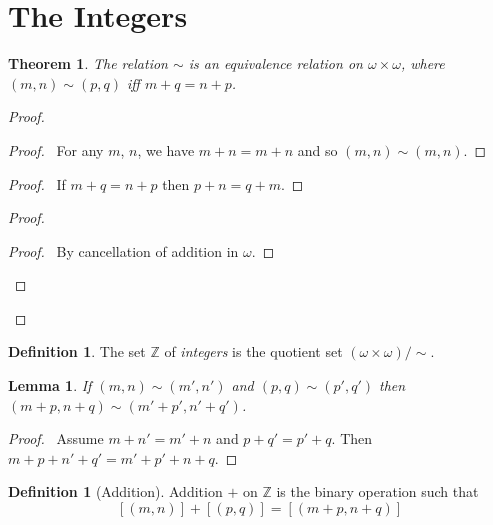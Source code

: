 \documentclass{article}
\let\qed\relax
\newtheorem{lemma}[axiom]{Lemma}
\newtheorem{theorem}[axiom]{Theorem}
\theoremstyle{definition}
\newtheorem{definition}[axiom]{Definition}
\begin{document}
    \section{The Integers}

    \begin{theorem}
        The relation $\sim$ is an equivalence relation on $\omega \times \omega$, where $(m,n) \sim (p,q)$ iff
        $m + q = n + p$.
    \end{theorem}

    \begin{proof}
        \pf
        \begin{proof}
            \pf\ For any $m$, $n$, we have $m + n = m + n$ and so $(m,n) \sim (m,n)$.
        \end{proof}
        \begin{proof}
            \pf\ If $m + q = n + p$ then $p + n = q + m$.
        \end{proof}
        \begin{proof}
            \begin{proof}
                \pf\ By cancellation of addition in $\omega$.
            \end{proof}
        \end{proof}
        \qed
    \end{proof}

    \begin{definition}
        The set $\mathbb{Z}$ of \emph{integers} is the quotient set $(\omega \times \omega) / \sim$.
    \end{definition}

    \begin{lemma}
        If $(m,n) \sim (m',n')$ and $(p,q) \sim (p',q')$ then $(m+p,n+q) \sim (m'+p',n'+q')$.
    \end{lemma}

    \begin{proof}
        \pf\ Assume $m + n' = m' + n$ and $p + q' = p' + q$. Then $m + p + n' + q' = m' + p' + n + q$. \qed
    \end{proof}

    \begin{definition}[Addition]
        Addition $+$ on $\mathbb{Z}$ is the binary operation such that
        \[ [(m,n)] + [(p,q)] = [(m+p,n+q)] \]
    \end{definition}
\end{document}
